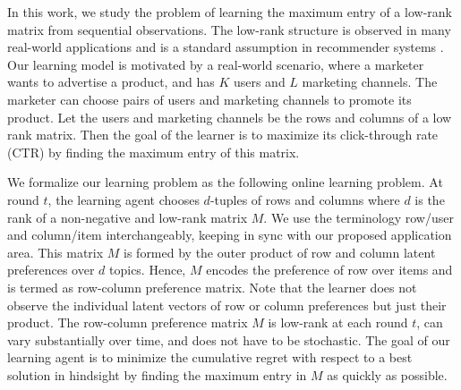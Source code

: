 In this work, we study the problem of learning the maximum entry of a low-rank matrix from sequential observations. The low-rank structure is observed in many real-world applications and is a standard assumption in recommender systems \citep{koren2009matrix,ricci2011liorrokach}. Our learning model is motivated by a real-world scenario, where a marketer wants to advertise a product, and has $K$ users and $L$ marketing channels. The marketer can choose pairs of users and marketing channels to promote its product. Let the users and marketing channels be the rows and columns of a low rank matrix. Then the goal of the learner is to maximize its click-through rate (CTR) by finding the maximum entry of this matrix.




We formalize our learning problem as the following online learning problem. At round $t$, the learning agent chooses $d$-tuples of rows and columns where $d$ is the rank of a non-negative and low-rank matrix $M$. We use the terminology row/user and column/item interchangeably, keeping in sync with our proposed application area. This matrix $M$ is formed by the outer product of row and column latent preferences over $d$ topics. Hence, $M$ encodes the preference of row over items and is termed as row-column preference matrix. Note that the learner does not observe the individual latent vectors of row or column preferences but just their product. The row-column preference matrix $M$ is low-rank at each round $t$, can vary substantially over time, and does not have to be stochastic. The goal of our learning agent is to minimize the cumulative regret with respect to a best solution in hindsight by finding the maximum entry in $M$ as quickly as possible.



